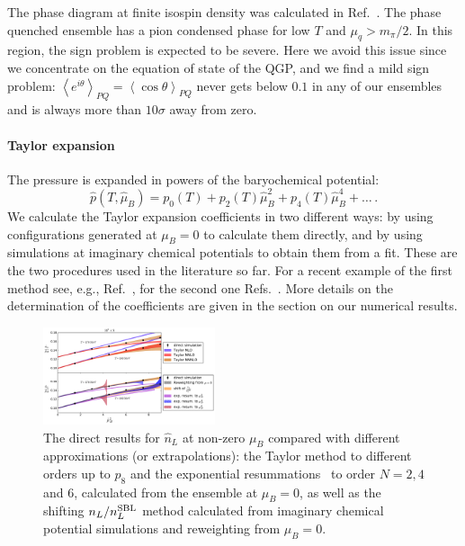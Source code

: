 \documentclass[twocolumn,showpacs,preprintnumbers,amsmath,amssymb,latexsym,prl,footinbib,floatfix,superscriptaddress]{revtex4-2}
\begin{document}
The phase diagram at finite isospin density 
was calculated in Ref.~\cite{Brandt:2017oyy}. 
The phase quenched ensemble has a pion condensed phase for low $T$
and $\mu_q > m_\pi/2$. 
In this region, the sign problem
is expected to be severe. 
Here we avoid this issue since we concentrate on 
the equation of state of the QGP, and we 
find a mild sign problem: 
$\left\langle e^{i \theta} \right\rangle_{PQ} = \left\langle \cos \theta \right\rangle_{PQ}$ never gets below $0.1$ in
any of our ensembles and is always more than $10 \sigma$ away from zero.

\paragraph{Taylor expansion}
The pressure is expanded in powers of the baryochemical potential:
\begin{equation}
    \hat{p}(T, \hat{\mu}_B) = p_0 \left( T \right) 
    + p_2 \left( T \right) \hat{\mu}_B^2
    + p_4 \left( T \right) \hat{\mu}_B^4
    + \dots\,.
\end{equation}
We calculate the Taylor expansion coefficients in two different ways: by using configurations generated
at $\mu_B = 0$ to calculate them directly, and 
by using simulations at imaginary chemical potentials to obtain
them from a fit.
These are the two procedures used in the literature so far. For a recent example of 
the first method see, e.g., Ref.~\cite{Bazavov:2020bjn},
for the second one Refs.~\cite{DElia:2016jqh,Borsanyi:2018grb}.
More details on the determination of the coefficients are 
given in the section on our numerical results.
\begin{figure}[t]
    \centering
    \includegraphics[width=0.45\textwidth]{plot7.pdf}
    \caption{
        \vspace{-0.02cm}
        The direct results for $\hat{n}_L$ at non-zero $\mu_B$ compared with different approximations (or extrapolations):
        the Taylor method to different orders up to $p_8$ 
        and the exponential resummations~\cite{Mondal:2021jxk} to order $N=2, 4$ and $6$, calculated 
        from the ensemble at $\mu_B=0$, as well as the shifting $n_L / n_L^{\rm{SBL}}$ method calculated from imaginary chemical
        potential simulations and reweighting from $\mu_B=0$.
        \vspace{-0.5cm}
    }
    \label{fig:muscan}
\end{figure}
\end{document}
